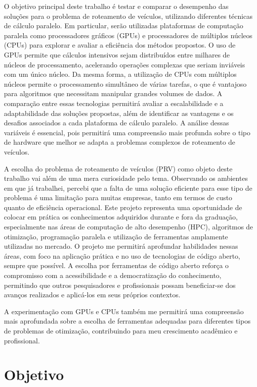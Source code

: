 \documentclass[
    openany,
    12pt,
    a4paper,
    twoside,
    english,
    brazil, sumario=tradicional
]{/home/lucas_galdino/Desktop/TCC/planning/abntex2/abntex2}
\let\oldchapter\chapter
\renewcommand{\chapter}{\clearpage\oldchapter}
\begin{document}
O objetivo principal deste trabalho é testar e comparar o desempenho das soluções para o problema de roteamento de veículos, 
utilizando diferentes técnicas de cálculo paralelo. Em particular, serão utilizadas plataformas de computação paralela como 
processadores gráficos (GPUs) e processadores de múltiplos núcleos (CPUs) para explorar e avaliar a eficiência dos métodos 
propostos. O uso de GPUs permite que cálculos intensivos sejam distribuídos entre milhares de núcleos de processamento, acelerando
operações complexas que seriam inviáveis com um único núcleo. Da mesma forma, a utilização de CPUs com múltiplos núcleos 
permite o processamento simultâneo de várias tarefas, o que é vantajoso para algoritmos que necessitam manipular grandes 
volumes de dados. A comparação entre essas tecnologias permitirá avaliar a escalabilidade e a adaptabilidade das soluções 
propostas, além de identificar as vantagens e os desafios associados a cada plataforma de cálculo paralelo. A análise dessas 
variáveis é essencial, pois permitirá uma compreensão mais profunda sobre o tipo de hardware que melhor se adapta a problemas 
complexos de roteamento de veículos.

A escolha do problema de roteamento de veículos (PRV) como objeto deste trabalho vai além de uma mera curiosidade pelo tema. 
Observando os ambientes em que já trabalhei, percebi que a falta de uma solução eficiente para esse tipo de problema é uma limitação 
para muitas empresas, tanto em termos de custo quanto de eficiência operacional. Este projeto representa uma oportunidade de colocar 
em prática os conhecimentos adquiridos durante e fora da graduação, especialmente nas áreas de computação de alto desempenho (HPC), 
algoritmos de otimização, programação paralela e utilização de ferramentas amplamente utilizadas no mercado. O projeto me permitirá 
aprofundar habilidades nessas áreas, com foco na aplicação prática e no uso de tecnologias de código aberto, sempre que possível. A 
escolha por ferramentas de código aberto reforça o compromisso com a acessibilidade e a democratização do conhecimento, permitindo 
que outros pesquisadores e profissionais possam beneficiar-se dos avanços realizados e aplicá-los em seus próprios contextos.

A experimentação com GPUs e CPUs também me permitirá uma compreensão mais aprofundada sobre a escolha de ferramentas adequadas 
para diferentes tipos de problemas de otimização, contribuindo para meu crescimento acadêmico e profissional.

\chapter{Objetivo}
\end{document}
